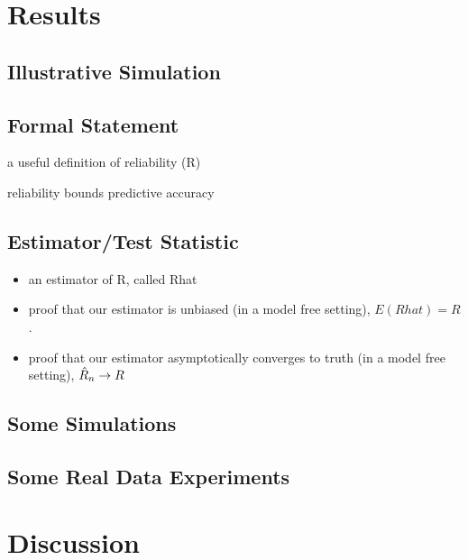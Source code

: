 \documentclass{article}
\begin{document}
\section{Results}



\subsection{Illustrative Simulation}


\subsection{Formal Statement}

a useful definition of reliability (R)

\begin{thm}
reliability bounds predictive accuracy
\end{thm}

\subsection{Estimator/Test Statistic}

\begin{itemize}
\item an estimator of R, called Rhat

\item proof that our estimator is unbiased (in a model free setting), 
$E(Rhat)=R$.

\item proof that our estimator asymptotically converges to truth (in a model free setting), $\hat{R}_n \rightarrow R$
\end{itemize}

\subsection{Some Simulations}

\subsection{Some Real Data Experiments}



\section{Discussion}

\end{document}
